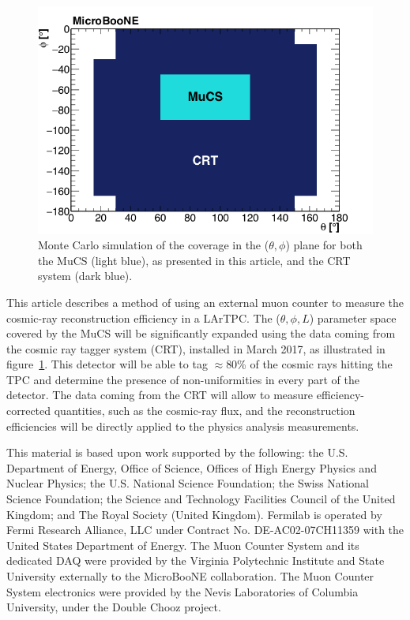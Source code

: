 \documentclass[a4paper,11pt]{article}
\begin{document}
\begin{figure}[htbp]
  \begin{center}
    \includegraphics[width=0.7\linewidth]{figures/crt.png}
    \caption{Monte Carlo simulation of the coverage in the ($\theta,\phi$) plane for both the MuCS (light blue), as presented in this article, and the CRT system (dark blue).} \label{fig:crt}
  \end{center}
\end{figure}

This article describes a method of using an external muon counter to measure the cosmic-ray reconstruction efficiency in a LArTPC. The ($\theta, \phi, L$) parameter space covered by the MuCS will be significantly expanded using the data coming from the cosmic ray tagger system (CRT), installed in March 2017, as illustrated in figure~\ref{fig:crt}. This detector will be able to tag $\approx$80\% of the cosmic rays hitting the TPC and determine the presence of non-uniformities in every part of the detector. The data coming from the CRT will allow to measure efficiency-corrected quantities, such as the cosmic-ray flux, and the reconstruction efficiencies will be directly applied to the physics analysis measurements.



\clearpage{}

\acknowledgments

This material is based upon work supported by the following: the U.S. Department of Energy, Office of Science, Offices of High Energy Physics and Nuclear Physics; the U.S. National Science Foundation; the Swiss National Science Foundation; the Science and Technology Facilities Council of the United Kingdom; and The Royal Society (United Kingdom). Fermilab is operated by Fermi Research Alliance, LLC under Contract No. DE-AC02-07CH11359 with the United States Department of Energy. The Muon Counter System and its dedicated DAQ were provided by the Virginia Polytechnic Institute and State University externally to the MicroBooNE collaboration. The Muon Counter System electronics were provided by the Nevis Laboratories of Columbia University, under the Double Chooz project.
\end{document}
